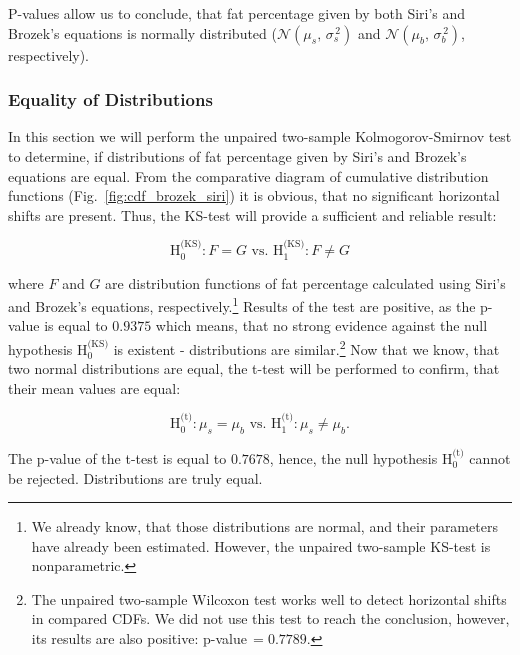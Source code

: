 \documentclass[11pt,american,american]{article}
\begin{document}
P-values allow us to conclude, that fat percentage given by both Siri's and Brozek's equations is normally distributed ($\mathcal{N} (\mu_{s},\,\sigma^{\,2}_{s})$ and $\mathcal{N} (\mu_{b},\,\sigma^{\,2}_{b})$, respectively).

\subsubsection{Equality of Distributions}

In this section we will perform the unpaired two-sample Kolmogorov-Smirnov test to determine, if distributions of fat percentage given by Siri's and Brozek's equations are equal. From the comparative diagram of cumulative distribution functions (Fig.~\ref{fig:cdf_brozek_siri}) it is obvious, that no significant horizontal shifts are present. Thus, the KS-test will provide a sufficient and reliable result:

\begin{equation*}
	\text{H}_{0}^{\text{(KS)}}: F=G \text{ vs. }
	\text{H}_{1}^{\text{(KS)}}: F \neq G
\end{equation*}

\medskip
\noindent
where $F$ and $G$ are distribution functions of fat percentage calculated using Siri's and Brozek's equations, respectively.\footnote{We already know, that those distributions are normal, and their parameters have already been estimated. However, the unpaired two-sample KS-test is nonparametric.} Results of the test are positive, as the p-value is equal to $0.9375$ which means, that no strong evidence against the null hypothesis $\text{H}_{0}^{\text{(KS)}}$ is existent - distributions are similar.\footnote{The unpaired two-sample Wilcoxon test works well to detect horizontal shifts in compared CDFs. We did not use this test to reach the conclusion, however, its results are also positive: p-value$\,=0.7789$.} Now that we know, that two normal distributions are equal, the t-test will be performed to confirm, that their mean values are equal:

\begin{equation*}
\text{H}_{0}^{\text{(t)}}: \mu_{s}=\mu_{b} \text{ vs. }
\text{H}_{1}^{\text{(t)}}: \mu_{s} \neq \mu_{b}.
\end{equation*}

\medskip

The p-value of the t-test is equal to $0.7678$, hence, the null hypothesis $\text{H}_{0}^{\text{(t)}}$ cannot be rejected. Distributions are truly equal.
\end{document}
